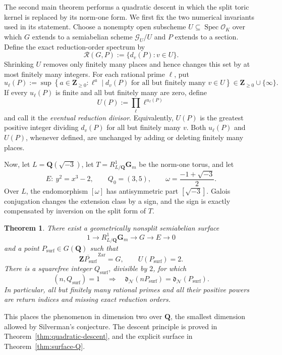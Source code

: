 \documentclass[11pt,letterpaper,reqno]{amsart}
\newtheorem{theorem}{Theorem}[section]
\theoremstyle{definition}
\theoremstyle{remark}
\newcommand{\Gm}{\mathbf G_m}
\newcommand{\Q}{\mathbf Q}
\newcommand{\Z}{\mathbf Z}
\newcommand{\Spec}{\operatorname{Spec}}
\newcommand{\Zar}{\mathrm{Zar}}
\newcommand{\Ner}{\mathcal N}
\begin{document}
The second main theorem performs a quadratic descent in which the split
toric kernel is replaced by its norm-one form.  We first fix the two numerical
invariants used in its
statement.  Choose a nonempty open subscheme
$U\subseteq\Spec\mathcal O_K$ over which $G$ extends to a semiabelian scheme
$\mathcal G_U/U$ and $P$ extends to a section.  Define the exact
reduction-order spectrum by
\[
 \mathscr R(G,P):=\{d_v(P):v\in U\}.
\]
Shrinking $U$ removes only finitely many places and hence changes this set by
at most finitely many integers.  For each rational prime $\ell$, put
\[
 u_\ell(P):=
 \sup\left\{
 a\in\mathbf Z_{\ge0}:
 \ell^a\mid d_v(P)
 \text{ for all but finitely many }v\in U
 \right\}
 \in\mathbf Z_{\ge0}\cup\{\infty\}.
\]
If every $u_\ell(P)$ is finite and all but finitely many are zero, define
\[
 U(P):=\prod_\ell\ell^{u_\ell(P)}
\]
and call it the \emph{eventual reduction divisor}.  Equivalently, $U(P)$ is
the greatest positive integer dividing $d_v(P)$ for all but finitely many
$v$.  Both $u_\ell(P)$ and $U(P)$, whenever defined, are unchanged by adding
or deleting finitely many places.



Now, let $L=\Q(\sqrt{-3})$, let
$T=R^1_{L/\Q}\Gm$ be the norm-one torus, and let
\[
 E:\ y^2=x^3-2,
 \qquad Q_0=(3,5),
 \qquad \omega=\frac{-1+\sqrt{-3}}2.
\]
Over $L$, the endomorphism $[\omega]$ has antisymmetric part
$[\sqrt{-3}]$.  Galois conjugation changes the extension class by a sign, and
the sign is exactly compensated by inversion on the split form of $T$. 

\begin{theorem}
\label{thm:intro-surface-Q}
There exist a geometrically nonsplit semiabelian surface
\[
 1\longrightarrow R^1_{L/\Q}\Gm\longrightarrow G\longrightarrow E
 \longrightarrow0
\]
and a point $P_{\mathrm{surf}}\in G(\Q)$ such that
\[
 \overline{\Z P_{\mathrm{surf}}}^{\,\Zar}=G,
 \qquad U(P_{\mathrm{surf}})=2.
\]
There is a squarefree integer $Q_{\mathrm{surf}}$, divisible by $2$, for which
\[
 (n,Q_{\mathrm{surf}})=1
 \quad\Longrightarrow\quad
 \mathfrak d_{\Ner}(nP_{\mathrm{surf}})
 =\mathfrak d_{\Ner}(P_{\mathrm{surf}}).
\]
In particular, all but finitely many rational primes and all their positive
powers are return indices and missing exact reduction orders.
\end{theorem}

This places the phenomenon in dimension two over $\Q$, the smallest dimension
allowed by Silverman's conjecture.  The descent principle is proved in
Theorem~\ref{thm:quadratic-descent}, and the explicit surface in
Theorem~\ref{thm:surface-Q}.
\end{document}
